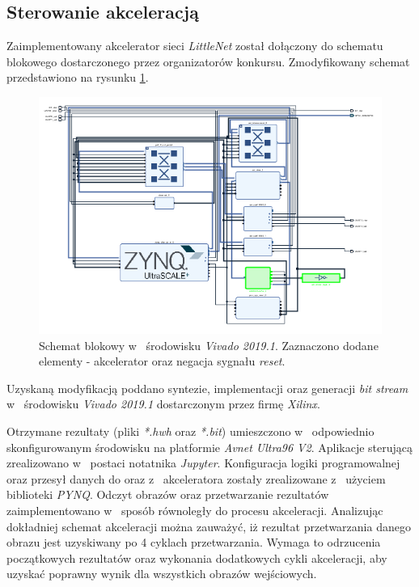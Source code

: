 \subsection{Sterowanie akceleracją}
\label{ch:sterowanie}
Zaimplementowany akcelerator sieci \emph{LittleNet} został dołączony do schematu blokowego dostarczonego przez organizatorów konkursu.
Zmodyfikowany schemat przedstawiono na rysunku \ref{fig:vivado}. 
\begin{figure}
    \centering
    \includegraphics[width=0.9\linewidth]{images/vivado.png}
    \caption{Schemat blokowy w~ środowisku \emph{Vivado 2019.1}. Zaznaczono dodane elementy - akcelerator oraz negacja sygnału \emph{reset}.}
    \label{fig:vivado}
\end{figure}

Uzyskaną modyfikacją poddano syntezie, implementacji oraz generacji \emph{bit stream} w~ środowisku \emph{Vivado 2019.1} dostarczonym przez firmę \emph{Xilinx}.

Otrzymane rezultaty (pliki \emph{*.hwh} oraz \emph{*.bit}) umieszczono w~ odpowiednio skonfigurowanym środowisku na platformie \emph{Avnet Ultra96 V2}.
Aplikacje sterującą zrealizowano w~ postaci notatnika \emph{Jupyter}.
Konfiguracja logiki programowalnej oraz przesył danych do oraz z~ akceleratora zostały zrealizowane z~ użyciem biblioteki \emph{PYNQ}. 
Odczyt obrazów oraz przetwarzanie rezultatów zaimplementowano w~ sposób równoległy do procesu akceleracji.
Analizując dokładniej schemat akceleracji można zauważyć, iż rezultat przetwarzania danego obrazu jest uzyskiwany po 4 cyklach przetwarzania.
Wymaga to odrzucenia początkowych rezultatów oraz wykonania dodatkowych cykli akceleracji, aby uzyskać poprawny wynik dla wszystkich obrazów wejściowych.



